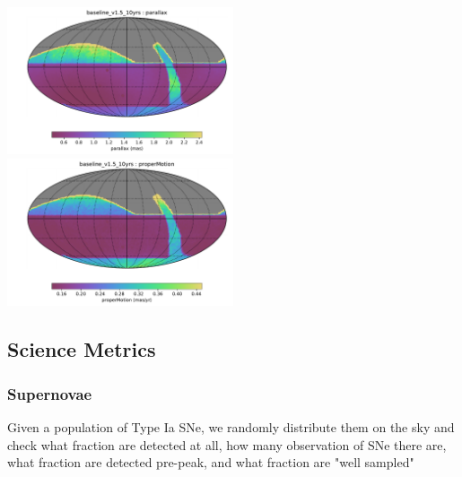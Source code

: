 {\includegraphics[width=0.5\textwidth]{metric_summary/baseline_v1.5_10yrs/baseline_v1_5_10yrs_parallax_HEAL_SkyMap.pdf}
\includegraphics[width=0.5\textwidth]{metric_summary/baseline_v1.5_10yrs/baseline_v1_5_10yrs_properMotion_HEAL_SkyMap.pdf}

\subsection{Science Metrics}

\subsubsection{Supernovae}

Given a population of Type Ia SNe, we randomly distribute them on the sky and check what fraction are detected at all, how many observation of SNe there are, what fraction are detected pre-peak, and what fraction are "well sampled"

}
